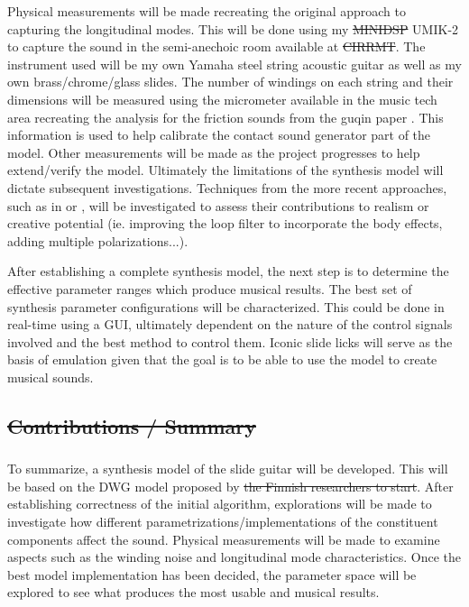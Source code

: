 \documentclass[12pt]{article}
\providecommand{\DIFadd}[1]{{\protect\color{blue}\uwave{#1}}} %
\providecommand{\DIFdel}[1]{{\protect\color{red}\sout{#1}}}                      %
\providecommand{\DIFaddbegin}{} %
\providecommand{\DIFaddend}{} %
\providecommand{\DIFdelbegin}{} %
\providecommand{\DIFdelend}{} %
\begin{document}
Physical measurements will be made recreating the original approach to capturing the longitudinal modes. This will be done using my \DIFdelbegin \DIFdel{MINIDSP }\DIFdelend \DIFaddbegin \DIFadd{miniDSP }\DIFaddend UMIK-2 to capture the sound in the semi-anechoic room available at \DIFdelbegin \DIFdel{CIRRMT}\DIFdelend \DIFaddbegin \DIFadd{CIRMMT}\DIFaddend . The instrument used will be my own Yamaha steel string acoustic guitar as well as my own brass/chrome/glass slides. The number of windings on each string and their dimensions will be measured using the micrometer available in the music tech area recreating the analysis for the friction sounds from the guqin paper \cite{penttinen_model-based_2006}. This information is used to help calibrate the contact sound generator part of the model. Other measurements will be made as the project progresses to help extend/verify the model. Ultimately the limitations of the synthesis model will dictate subsequent investigations. Techniques from the more recent approaches, such as in \cite{bhanuprakash_finite_2020} or \cite{evangelista_physical_2012}, will be investigated to assess their contributions to realism or creative potential (ie. improving the loop filter to incorporate the body effects, adding multiple polarizations...).

After establishing a complete synthesis model, the next step is to determine the effective parameter ranges which produce musical results. The best set of synthesis parameter configurations will be characterized. This could be done in real-time using a GUI, ultimately dependent on the nature of the control signals involved and the best method to control them. Iconic slide licks will serve as the basis of emulation given that the goal is to be able to use the model to create musical sounds.

\DIFdelbegin \subsection*{\DIFdel{Contributions / Summary}}
\DIFdelend \DIFaddbegin \subsubsection*{\DIFadd{Contributions / Summary}}
\DIFaddend \paragraph{}
To summarize, a synthesis model of the slide guitar will be developed. This will be based on the DWG model proposed by \DIFdelbegin \DIFdel{the Finnish researchers to start}\DIFdelend \DIFaddbegin \DIFadd{in \mbox{%
\cite{pakarinen_virtual_2008} }\hskip0pt%
and \mbox{%
\cite{puputti_real-time_2012}}\hskip0pt%
}\DIFaddend . After establishing correctness of the initial algorithm, explorations will be made to investigate how different parametrizations/implementations of the constituent components affect the sound. Physical measurements will be made to examine aspects such as the winding noise and longitudinal mode characteristics. Once the best model implementation has been decided, the parameter space will be explored to see what produces the most usable and musical results.

\clearpage


\end{document}
